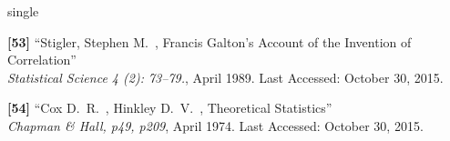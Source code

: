 \documentclass[12pt]{uthesis-v12}  %
\begin{document}
\begin{referencelist}{single}
	\item \textbf{[53]} ``Stigler, Stephen M.~, Francis Galton's Account of the Invention of Correlation''
	\\\emph{ Statistical Science 4 (2): 73–79.}, April 1989. Last Accessed: October 30, 2015.

	\item \textbf{[54]} ``Cox D.~R.~, Hinkley D.~V.~, Theoretical Statistics''
	\\\emph{Chapman \& Hall, p49, p209}, April 1974. Last Accessed: October 30, 2015.					
\end{referencelist}




%
%
%
%
%
\end{document}
